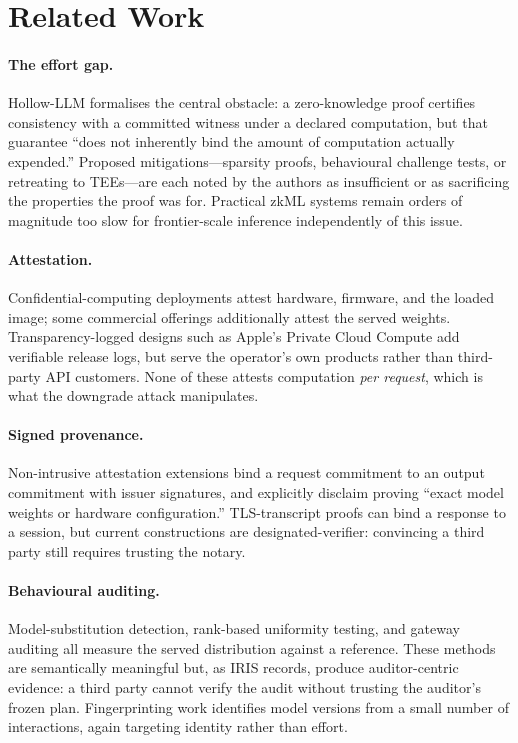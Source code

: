 \documentclass[11pt]{article}
\theoremstyle{definition}
\begin{document}
\section{Related Work}

\paragraph{The effort gap.} Hollow-LLM formalises the central obstacle: a
zero-knowledge proof certifies consistency with a committed witness under a
declared computation, but that guarantee ``does not inherently bind the amount of
computation actually expended.'' Proposed mitigations---sparsity proofs,
behavioural challenge tests, or retreating to TEEs---are each noted by the
authors as insufficient or as sacrificing the properties the proof was for.
Practical zkML systems remain orders of magnitude too slow for frontier-scale
inference independently of this issue.

\paragraph{Attestation.} Confidential-computing deployments attest hardware,
firmware, and the loaded image; some commercial offerings additionally attest the
served weights. Transparency-logged designs such as Apple's Private Cloud Compute
add verifiable release logs, but serve the operator's own products rather than
third-party API customers. None of these attests computation \emph{per request},
which is what the downgrade attack manipulates.

\paragraph{Signed provenance.} Non-intrusive attestation extensions bind a
request commitment to an output commitment with issuer signatures, and explicitly
disclaim proving ``exact model weights or hardware configuration.''
TLS-transcript proofs can bind a response to a session, but current constructions
are designated-verifier: convincing a third party still requires trusting the
notary.

\paragraph{Behavioural auditing.} Model-substitution detection, rank-based
uniformity testing, and gateway auditing all measure the served distribution
against a reference. These methods are semantically meaningful but, as IRIS
records, produce auditor-centric evidence: a third party cannot verify the audit
without trusting the auditor's frozen plan. Fingerprinting work identifies model
versions from a small number of interactions, again targeting identity rather
than effort.
\end{document}
